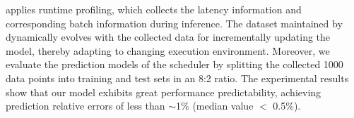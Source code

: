\sys applies runtime profiling, which collects the latency information and corresponding batch information during inference.
The dataset maintained by \sys dynamically evolves with the collected data for incrementally updating the model, thereby adapting to changing execution environment.
Moreover, we evaluate the prediction models of the \sys scheduler by splitting the collected 1000 data points into training and test sets in an 8:2 ratio. 
The experimental results show that our model exhibits great performance predictability, achieving prediction relative errors of less than $\sim$1\% (median value $<$ 0.5\%).

















